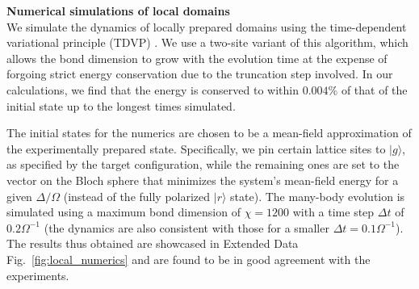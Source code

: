 \documentclass[reprint,twocolumn,secnumarabic,amssymb, aps, prx]{revtex4-2}
\begin{document}
\noindent\textbf{Numerical simulations of local domains}\\
We simulate the dynamics of locally prepared domains using the time-dependent variational principle (TDVP) \cite{haegeman2011tdvp,haegeman2016tdvp}. We use a two-site variant of this algorithm, which allows the bond dimension to grow with the evolution time at the expense of forgoing strict energy conservation due to the truncation step involved. In our calculations, we find that the energy is conserved to within $0.004 \%$ of that of the initial state up to the longest times simulated.

The initial states for the numerics are chosen to be a mean-field approximation of the experimentally prepared state. Specifically, we pin certain lattice sites to $\rvert g \rangle$, as specified by the target configuration, while the remaining ones are set to the vector on the Bloch sphere that minimizes the system’s mean-field energy for a given $\Delta/\Omega$ (instead of the fully polarized $\rvert r \rangle$ state). The many-body evolution is simulated using a maximum bond dimension of $\chi = 1200$ with a time step $\Delta t$ of $0.2 \Omega^{-1}$ (the dynamics are also consistent with those for a smaller $\Delta t = 0.1 \Omega^{-1}$).
The results thus obtained are showcased in Extended Data Fig.~\ref{fig:local_numerics} and are found to be in good agreement with the experiments.\\
\end{document}

